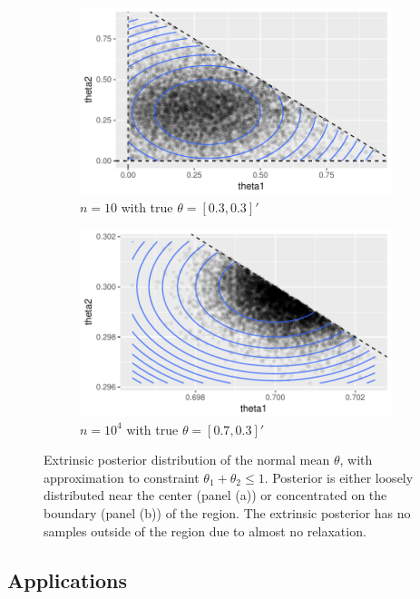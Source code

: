 \documentclass[10pt]{article}
\DeclareMathOperator{\1}{\mathbbm{1}}
\begin{document}
\begin{figure}[H]
   \begin{subfigure}[b]{0.45\textwidth}
    \includegraphics[width=1\textwidth]{linear_inequal_1}
    \caption{$n=10$ with true $\theta=[0.3,0.3]'$}
	\end{subfigure}
    \begin{subfigure}[b]{0.45\textwidth}
     \includegraphics[width=1\textwidth]{linear_inequal_2}
     \caption{$n=10^4$ with true $\theta=[0.7,0.3]'$}
     	\end{subfigure}
\caption{Extrinsic posterior distribution of the normal mean $\theta$, with approximation to constraint $\theta_1+\theta_2\le 1$. Posterior is either loosely distributed near the center (panel (a)) or concentrated on the boundary (panel (b)) of the region. The extrinsic posterior has no samples outside of the region due to almost no relaxation.}
\label{linear_inequality}
\end{figure}

\subsection{Applications}
\end{document}
